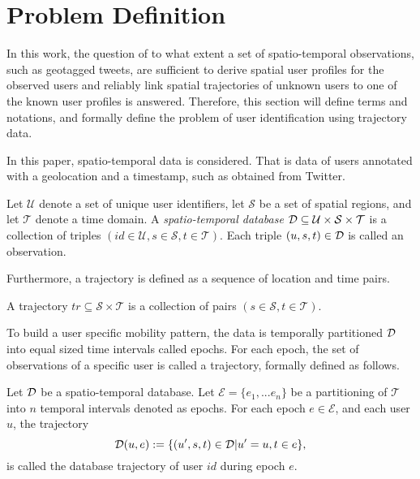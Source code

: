 
\chapter[Problem Definition]{Problem Definition}
\label{sec:probdef}
In this work, the question of to what extent a set of spatio-temporal observations, such as geotagged tweets, are sufficient to derive spatial user profiles for the observed users and reliably link spatial trajectories of unknown users to one of the known user profiles is answered. Therefore, this section will define terms and notations, and formally define the problem of user identification using trajectory data.

In this paper, spatio-temporal data is considered. That is data of users annotated with a geolocation and a timestamp, such as obtained from Twitter.
\begin{definition}
Let $\mathcal{U}$ denote a set of unique user identifiers, let $\mathcal{S}$ be a set of spatial regions, and let $\mathcal{T}$ denote a time domain.
A \emph{spatio-temporal database} $\mathcal{D}\subseteq \mathcal{U}\times \mathcal{S}\times \mathcal{T}$ is a collection of triples $(id\in\mathcal{U},s\in\mathcal{S},t\in\mathcal{T})$. Each triple $(u,s,t)\in\mathcal{D}$ is called an observation.
\end{definition}
Furthermore, a trajectory is defined as a sequence of location and time pairs.
\begin{definition}[Trajectory]
A trajectory $tr\subseteq \mathcal{S}\times\mathcal{T}$ is a collection of pairs $(s\in\mathcal{S},t\in\mathcal{T})$.
\end{definition}

To build a user specific mobility pattern, the data is temporally partitioned $\mathcal{D}$ into equal sized time intervals called epochs. For each epoch, the set of observations of a specific user is called a trajectory, formally defined as follows.
\begin{definition}
Let $\mathcal{D}$ be a spatio-temporal database. Let $\mathcal{E}=\{e_1,...e_n\}$ be a partitioning of $\mathcal{T}$ into $n$ temporal intervals denoted as epochs. For each epoch $e\in\mathcal{E}$, and each user $u$, the trajectory
$$
\mathcal{D}(u,e):=\{(u^\prime,s,t)\in\mathcal{D}|u^\prime=u, t\in e\},
$$
is called the database trajectory of user $id$ during epoch $e$.
\end{definition}


